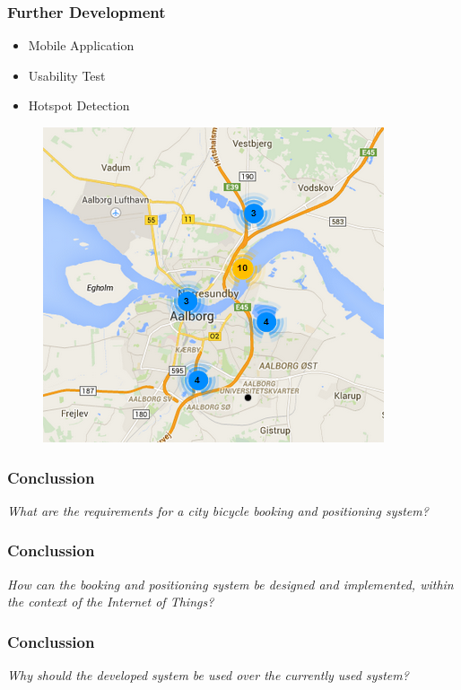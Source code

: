 \begin{frame}
\frametitle{Further Development}
\begin{itemize}
	\item Mobile Application
	\item Usability Test
	\item Hotspot Detection
\end{itemize}
\begin{figure}
\centering
\includegraphics[scale=0.5]{MarkerClusterer}
\end{figure}
\end{frame}

\begin{frame}
\frametitle{Conclussion}
\begin{center}
	\textit{What are the requirements for a city bicycle booking and positioning system?}
\end{center}
\end{frame}

\begin{frame}
	\frametitle{Conclussion}
	\begin{center}
		\textit{How can the booking and positioning system be designed and implemented, within the context of the Internet of Things?}
	\end{center}
\end{frame}

\begin{frame}
	\frametitle{Conclussion}
	\begin{center}
		\textit{Why should the developed system be used over the currently used system?}
	\end{center}
\end{frame}